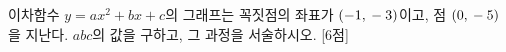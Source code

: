 이차함수 $y=ax^2+bx+c$의 그래프는 꼭짓점의 좌표가 $(-1{,}\mkern3mu -3)$이고, 점 $(0{,}\mkern3mu -5)$을 지난다. $abc$의 값을 구하고, 그 과정을 서술하시오.  \mbox{[6점]}
